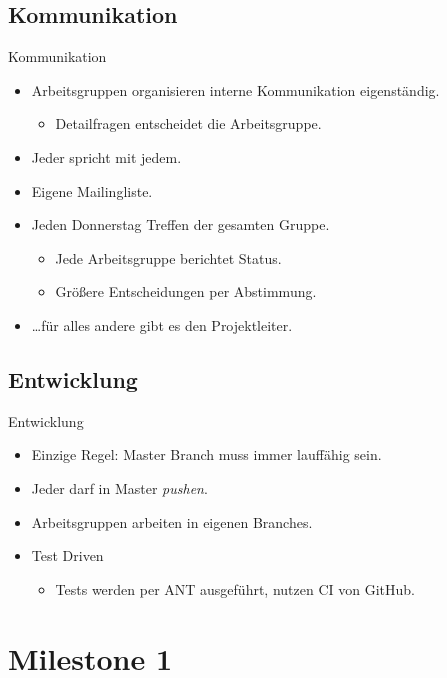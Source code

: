\documentclass[ucs,10pt]{beamer}
\newlength{\wideitemsep}
\let\olditem\item
\renewcommand{\item}{\setlength{\itemsep}{\wideitemsep}\olditem}
\begin{document}
\subsection{Kommunikation}
\begin{frame}{Kommunikation}
  \begin{itemize}
  	\item Arbeitsgruppen organisieren interne Kommunikation eigenständig.
  	\begin{itemize}
  		\item Detailfragen entscheidet die Arbeitsgruppe.
  	\end{itemize}
  	\item Jeder spricht mit jedem.
  	\item Eigene Mailingliste.
  	\item Jeden Donnerstag Treffen der gesamten Gruppe.
  	\begin{itemize}
  		\item Jede Arbeitsgruppe berichtet Status.
  		\item Größere Entscheidungen per Abstimmung.
  	\end{itemize}
  	\item \dots für alles andere gibt es den Projektleiter.
  \end{itemize}
\end{frame}

\subsection{Entwicklung}
\begin{frame}{Entwicklung}
  \begin{itemize}
  	\item Einzige Regel: Master Branch muss immer lauffähig sein.
  	\item Jeder darf in Master \emph{pushen}.
  	\item Arbeitsgruppen arbeiten in eigenen Branches.
  	\item Test Driven
  	\begin{itemize}
  		\item Tests werden per ANT ausgeführt, nutzen CI von GitHub.
  	\end{itemize}
  \end{itemize}
\end{frame}

\section{Milestone 1}
\end{document}

